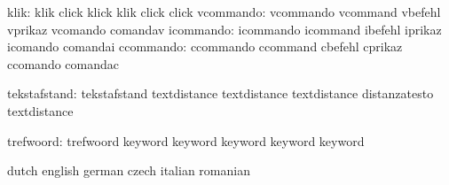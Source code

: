                      klik: klik                      click
                           klick                     klik
                           click                     click
                vcommando: vcommando                 vcommand
                           vbefehl                   vprikaz
                           vcomando                  comandav
                icommando: icommando                 icommand
                           ibefehl                   iprikaz
                           icomando                  comandai
                ccommando: ccommando                 ccommand
                           cbefehl                   cprikaz
                           ccomando                  comandac

             tekstafstand: tekstafstand              textdistance 
                           textdistance              textdistance 
                           distanzatesto             textdistance %

trefwoord: trefwoord keyword
           keyword keyword
           keyword keyword

\stopconstants




\startvariables            dutch                     english
                           german                    czech
                           italian                   romanian

